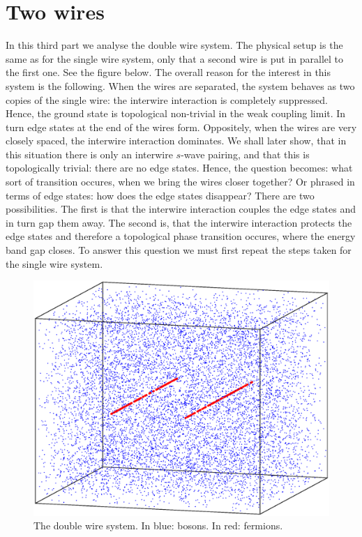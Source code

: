 \documentclass[11pt, twoside]{Thesis} %
\begin{document}
{\newpage


 
 
 
 

\part{Two wires}
In this third part we analyse the double wire system. The physical setup is the same as for the single wire system, only that a second wire is put in parallel to the first one. See the figure below. The overall reason for the interest in this system is the following. When the wires are separated, the system behaves as two copies of the single wire: the interwire interaction is completely suppressed. Hence, the ground state is topological non-trivial in the weak coupling limit. In turn edge states at the end of the wires form. Oppositely, when the wires are very closely spaced, the interwire interaction dominates. We shall later show, that in this situation there is only an interwire $s$-wave pairing, and that this is topologically trivial: there are no edge states. Hence, the question becomes: what sort of transition occures, when we bring the wires closer together? Or phrased in terms of edge states: how does the edge states disappear? There are two possibilities. The first is that the interwire interaction couples the edge states and in turn gap them away. The second is, that the interwire interaction protects the edge states and therefore a topological phase transition occures, where the energy band gap closes. To answer this question we must first repeat the steps taken for the single wire system. 
\begin{figure}[H]
\center
\includegraphics[width=0.8\columnwidth]{gasandwires3.eps}
\\ The double wire system. In blue: bosons. In red: fermions.   
\end{figure}
\newpage

}
\end{document}
